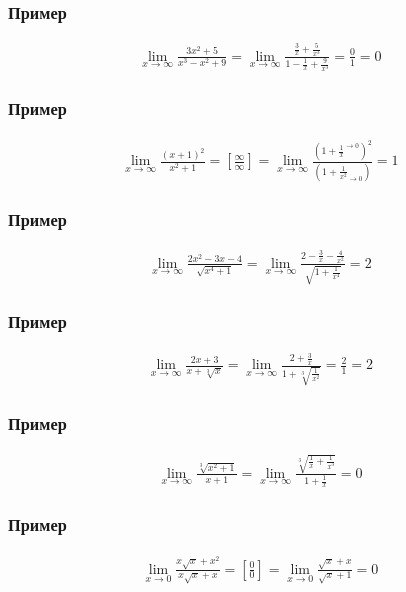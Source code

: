 \documentclass{article}
\begin{document}
\subsubsection{Пример}
\begin{gather*}
    \lim_{x \to \infty} \frac{3x^2 + 5}{x^3 - x^2 + 9} = 
    \lim_{x \to \infty} \frac{\frac{3}{x} + \frac{5}{x^3}}{1 - \frac{1}{x} + \frac{9}{x^3}} = 
    \frac{0}{1} = 0
\end{gather*}

\subsubsection{Пример}
\begin{gather*}
    \lim_{x \to \infty} \frac{(x + 1)^2}{x^2 + 1} = \left[ \frac{\infty}{\infty} \right] =
    \lim_{x \to \infty} \frac{\left( 1 + \boxed{\frac{1}{x}}^{\to 0} \right)^2}{\left( 1 + \boxed{\frac{1}{x^2}}_{\to 0} \right)} = 1
\end{gather*}

\subsubsection{Пример}
\begin{gather*}
    \lim_{x \to \infty} \frac{2x^2 - 3x - 4}{\sqrt{x^4 + 1}} =
    \lim_{x \to \infty} \frac{2 - \frac{3}{x} - \frac{4}{x^2}}{\sqrt{1 + \frac{1}{x^4}}} = 2
\end{gather*}

\subsubsection{Пример}
\begin{gather*}
    \lim_{x \to \infty} \frac{2x + 3}{x + \sqrt[3]{x}} =
    \lim_{x \to \infty} \frac{2 + \frac{3}{x}}{1 + \sqrt[3]{\frac{1}{x^2}}} = \frac{2}{1} = 2
\end{gather*}

\subsubsection{Пример}
\begin{gather*}
    \lim_{x \to \infty} \frac{\sqrt[3]{x^2 + 1}}{x + 1} =
    \lim_{x \to \infty} \frac{\sqrt[3]{\frac{1}{x} + \frac{1}{x^3}}}{1 + \frac{1}{x}} = 0    
\end{gather*}

\subsubsection{Пример}
\begin{gather*}
    \lim_{x \to 0} \frac{x \sqrt{x} + x^2}{x \sqrt{x} + x} = 
    \left[ \frac{0}{0} \right] =
    \lim_{x \to 0} \frac{\sqrt{x} + x}{\sqrt{x} + 1} = 0
\end{gather*}
\end{document}

